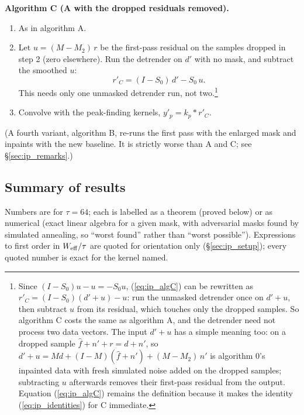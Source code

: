 \documentclass{article}
\numberwithin{equation}{section}   %
\begin{document}
{\bf Algorithm C (A with the dropped residuals removed).}
\begin{enumerate}
\item[1--3.] As in algorithm A.
\item[4.] Let $u = (M - M_2)\,r$ be the first-pass residual on the samples dropped in step 2 (zero
      elsewhere).  Run the detrender on $d'$ with no mask, and subtract the smoothed $u$:
\begin{equation}
r'_C = (I - S_0)\,d' - S_0\, u .
\label{eq:ip_algC}
\end{equation}
      This needs only one unmasked detrender run, not two.\footnote{Since $(I - S_0)u - u = -S_0 u$,
      (\ref{eq:ip_algC}) can be rewritten as $r'_C = (I - S_0)(d' + u) - u$: run the unmasked detrender
      once on $d' + u$, then subtract $u$ from its residual, which touches only the dropped samples.  So
      algorithm C costs the same as algorithm A, and the detrender need not process two data vectors.
      The input $d' + u$ has a simple meaning too: on a dropped sample $\hat f + n' + r = d + n'$, so
      $d' + u = Md + (I - M)(\hat f + n') + (M - M_2)\,n'$ is algorithm 0's inpainted data with fresh
      simulated noise added on the dropped samples; subtracting $u$ afterwards removes their first-pass
      residual from the output.  Equation (\ref{eq:ip_algC}) remains the definition because it makes the
      identity (\ref{eq:ip_identities}) for C immediate.}
\item[5.] Convolve with the peak-finding kernels, $y'_p = k_p * r'_C$.
\end{enumerate}

(A fourth variant, algorithm B, re-runs the first pass with the enlarged mask and inpaints with the new
baseline.  It is strictly worse than A and C; see \S\ref{sec:ip_remarks}.)

\subsection{Summary of results}
\label{sec:ip_results}

Numbers are for $\tau = 64$; each is labelled as a theorem (proved below) or as
numerical (exact linear algebra for a given mask, with adversarial masks found by simulated annealing,
so ``worst found'' rather than ``worst possible'').  Expressions to first order in $W_{\rm eff}/\tau$
are quoted for orientation only (\S\ref{sec:ip_setup}); every quoted number is exact for the kernel named.
\end{document}
